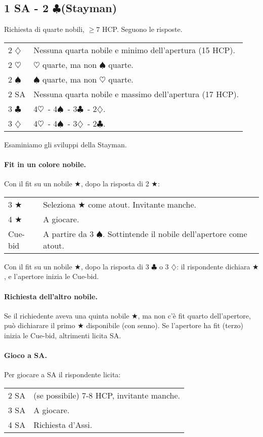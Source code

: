 \documentclass[a4paper,10pt]{article}
\renewcommand{\c}{$\clubsuit$\xspace}
\renewcommand{\d}{$\diamondsuit$\xspace}
\newcommand{\h}{$\heartsuit$\xspace}
\newcommand{\s}{$\spadesuit$\xspace}
\renewcommand{\j}{$\bigstar$\xspace}
\newcommand{\sa}{SA\xspace}
\newcommand{\smallspace}{\vskip0.3cm}
\newenvironment{twocol}
  {\smallspace\noindent\begin{tabular}{l p{0.8\textwidth}}}
  {\end{tabular}\smallspace}
\begin{document}
\subsection{1 SA - 2 \c (Stayman)}

Richiesta di quarte nobili, $\geq 7$ HCP. Seguono le risposte.

\begin{twocol}
 2 \d & Nessuna quarta nobile e minimo dell'apertura (15 HCP).\\
 2 \h & \h quarte, ma non \s quarte.\\
 2 \s & \s quarte, ma non \h quarte.\\
 2 SA & Nessuna quarta nobile e massimo dell'apertura (17 HCP).\\
 3 \c & 4\h\ - 4\s\ - 3\c\ - 2\d.\\
 3 \d & 4\h\ - 4\s\ - 3\d\ - 2\c.\\
\end{twocol}

\noindent Esaminiamo gli sviluppi della Stayman.

\paragraph{Fit in un colore nobile.}

Con il fit su un nobile \j, dopo la risposta di 2 \j:
\begin{twocol}
 3 \j & Seleziona \j come atout. Invitante manche.\\
 4 \j & A giocare.\\
 Cue-bid & A partire da 3 \s. Sottintende il nobile dell'apertore come atout.\\
\end{twocol}

\noindent Con il fit su un nobile \j, dopo la risposta di 3 \c o 3 \d: il rispondente dichiara \j, e l'apertore inizia le Cue-bid.


\paragraph{Richiesta dell'altro nobile.}
Se il richiedente aveva una quinta nobile \j, ma non c'\`e fit quarto dell'apertore, può dichiarare il primo \j disponibile (con senno). Se l'apertore ha fit (terzo) inizia le Cue-bid, altrimenti licita \sa.

\paragraph{Gioco a SA.}
Per giocare a SA il rispondente licita:
\begin{twocol}
 2 \sa & (se possibile) 7-8 HCP, invitante manche.\\
 3 \sa & A giocare.\\
 4 \sa & Richiesta d'Assi.
\end{twocol}
\end{document}
